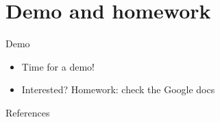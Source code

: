 \documentclass[usenames,dvipsnames,t]{beamer}
\begin{document}

\section{Demo and homework}

\begin{frame}{Demo}

  \def\x{5mm}

  \begin{itemize}
    \item Time for a demo!
    
    \vspace{\x}

    \item Interested? Homework: check the Google docs
  \end{itemize}
      
\end{frame}

\begin{frame}{References}

\printbibliography
    
\end{frame}


\appendix









  



\end{document}
